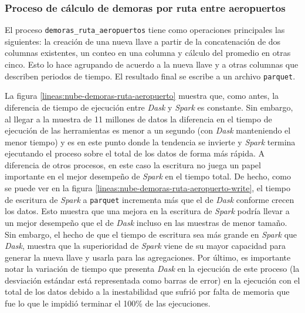 \subsubsection{Proceso de cálculo de demoras por ruta entre aeropuertos}

El proceso \texttt{demoras\_ruta\_aeropuertos} tiene como operaciones principales las siguientes: la creación de una nueva llave a partir de la concatenación de dos columnas existentes, un conteo en una columna y cálculo del promedio en otras cinco. Esto lo hace agrupando de acuerdo a la nueva llave y a otras columnas que describen periodos de tiempo. El resultado final se escribe a un archivo \texttt{parquet}.

La figura \ref{lineas:nube-demoras-ruta-aeropuerto}
muestra que, como antes, la diferencia de tiempo de ejecución entre \textit{Dask} y \textit{Spark} es constante. Sin embargo, al llegar a la muestra de 11 millones de datos la diferencia en el tiempo de ejecución de las herramientas es menor a un segundo (con \textit{Dask} manteniendo el menor tiempo) y es en este punto donde la tendencia se invierte y \textit{Spark} termina ejecutando el proceso sobre el total de los datos de forma más rápida. A diferencia de otros procesos, en este caso la escritura no juega un papel importante en el mejor desempeño de \textit{Spark} en el tiempo total. De hecho, como se puede ver en la figura \ref{lineas:nube-demoras-ruta-aeropuerto-write}, el tiempo de escritura de \textit{Spark} a \texttt{parquet} incrementa más que el de \textit{Dask} conforme crecen los datos. Esto muestra que una mejora en la escritura de \textit{Spark} podría llevar a un mejor desempeño que el de \textit{Dask} incluso en las muestras de menor tamaño. Sin embargo, el hecho de que el tiempo de escritura sea más grande en \textit{Spark} que \textit{Dask}, muestra que la superioridad de \textit{Spark} viene de su mayor capacidad para generar la nueva llave y usarla para las agregaciones. Por último, es importante notar la variación de tiempo que presenta  \textit{Dask} en la ejecución de este proceso (la desviación estándar está representada como barras de error) en la ejecución con el total de los datos debido a la inestabilidad que sufrió por falta de memoria que fue lo que le impidió terminar el 100\% de las ejecuciones. 

